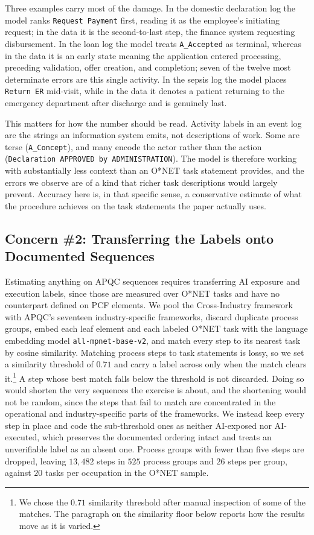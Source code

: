 Three examples carry most of the damage.
In the domestic declaration log the model ranks \texttt{Request Payment} first, reading it as the employee's initiating request; in the data it is the second-to-last step, the finance system requesting disbursement.
In the loan log the model treats \texttt{A\_Accepted} as terminal, whereas in the data it is an early state meaning the application entered processing, preceding validation, offer creation, and completion; seven of the twelve most determinate errors are this single activity.
In the sepsis log the model places \texttt{Return ER} mid-visit, while in the data it denotes a patient returning to the emergency department after discharge and is genuinely last.

This matters for how the number should be read.
Activity labels in an event log are the strings an information system emits, not descriptions of work.
Some are terse (\texttt{A\_Concept}), and many encode the actor rather than the action (\texttt{Declaration APPROVED by ADMINISTRATION}).
The model is therefore working with substantially less context than an O*NET task statement provides, and the errors we observe are of a kind that richer task descriptions would largely prevent.
Accuracy here is, in that specific sense, a conservative estimate of what the procedure achieves on the task statements the paper actually uses.


\subsection{Concern \#2: Transferring the Labels onto Documented Sequences}
\label{app:apqc_fragmentation_top}

Estimating anything on APQC sequences requires transferring AI exposure and execution labels, since those are measured over O*NET tasks and have no counterpart defined on PCF elements.
We pool the Cross-Industry framework with APQC's seventeen industry-specific frameworks, discard duplicate
process groups, embed each leaf element and each labeled O*NET task with the language embedding model \texttt{all-mpnet-base-v2}, and match every step to its nearest task by cosine similarity.
Matching process steps to task statements is lossy, so we set a similarity threshold of $0.71$ and carry a
label across only when the match clears it.\footnote{We chose the $0.71$ similarity threshold after manual inspection of some of the matches. The paragraph on the similarity floor below reports how the results move as it is varied.}
A step whose best match falls below the threshold is not discarded.
Doing so would shorten the very sequences the exercise is about, and the shortening would not be random, since
the steps that fail to match are concentrated in the operational and industry-specific parts of the frameworks.
We instead keep every step in place and code the sub-threshold ones as neither AI-exposed nor AI-executed,
which preserves the documented ordering intact and treats an unverifiable label as an absent one.
Process groups with fewer than five steps are dropped, leaving $13{,}482$ steps in $525$ process groups and
$26$ steps per group, against $20$ tasks per occupation in the O*NET sample.


